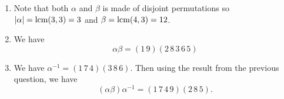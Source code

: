 \begin{sol}
\begin{enumerate}
    \item Note that both $\alpha$ and $\beta$ is made of disjoint permutations so $|\alpha|=\operatorname{lcm}(3,3)=3$ and $\beta=\operatorname{lcm}(4,3)=12$.
    \item We have
    $$ 
        \alpha \beta = (1\,9)(2\,8\,3\,6\,5)
    $$
    \item We have $\alpha^{-1} = (1\,7\,4)(3\,8\,6)$. Then using the result from the previous question, we have
    $$ 
        (\alpha \beta)\alpha^{-1} = (1\,7\,4\,9)(2\,8\,5).
    $$
\end{enumerate}
\end{sol}